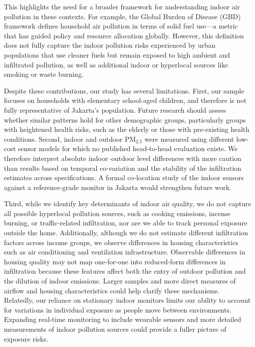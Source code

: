 \documentclass[9pt,twocolumn,twoside]{pnas-new}
\begin{document}
This highlights the need for a broader framework for understanding indoor air pollution in these contexts. For example, the Global Burden of Disease (GBD) framework defines household air pollution in terms of solid fuel use—a metric that has guided policy and resource allocation globally. However, this definition does not fully capture the indoor pollution risks experienced by urban populations that use cleaner fuels but remain exposed to high ambient and infiltrated pollution, as well as additional indoor or hyperlocal sources like smoking or waste burning. 


Despite these contributions, our study has several limitations. First, our sample focuses on  households with elementary school-aged children, and therefore is not fully representative of Jakarta’s population. Future research should assess whether similar patterns hold for other demographic groups, particularly groups with heightened health risks, such as the elderly or those with pre-existing health conditions. Second, indoor and outdoor PM$_{2.5}$ were measured using different low-cost sensor models for which no published head-to-head evaluation exists. We therefore interpret absolute indoor–outdoor level differences with more caution than results based on temporal co-variation and the stability of the infiltration estimates across specifications. A formal co-location study of the indoor sensors against a reference-grade monitor in Jakarta would strengthen future work. 


Third, while we identify key determinants of indoor air quality, we do not capture all possible hyperlocal pollution sources, such as cooking emissions, incense burning, or traffic-related infiltration, nor are we able to track personal exposure outside the home. 
Additionally, although we do not estimate different infiltration factors across income groups, we observe differences in housing characteristics such as air conditioning and ventilation infrastructure. Observable differences in housing quality may not map one-for-one into reduced-form differences in infiltration because these features affect both the entry of outdoor pollution and the dilution of indoor emissions. Larger samples and more direct measures of airflow and housing characteristics could help clarify these mechanisms.
Relatedly, our reliance on stationary indoor monitors limits our ability to account for variations in individual exposure as people move between environments. Expanding real-time monitoring to include wearable sensors and more detailed measurements of indoor pollution sources could provide a fuller picture of exposure risks.
\end{document}
